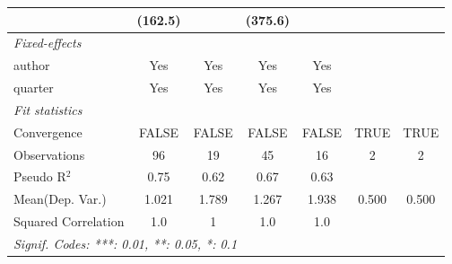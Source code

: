 \begin{tabular}{lcccccc}
                              & (162.5)       &               & (375.6)       &               &      &   \\   
   \midrule
   \emph{Fixed-effects}\\
   author                     & Yes           & Yes           & Yes           & Yes           &      & \\  
   quarter                    & Yes           & Yes           & Yes           & Yes           &      & \\  
   \midrule
   \emph{Fit statistics}\\
   Convergence                &FALSE          & FALSE         & FALSE         & FALSE         & TRUE & TRUE\\  
   Observations               & 96            & 19            & 45            & 16            & 2    & 2\\  
   Pseudo R$^2$               & 0.75          & 0.62          & 0.67          & 0.63          &      & \\  
Mean(Dep. Var.) & 1.021 & 1.789 & 1.267 & 1.938 & 0.500 & 0.500 \\
   Squared Correlation        & 1.0           & 1             & 1.0           & 1.0           &      & \\  
   \midrule \midrule
   \multicolumn{7}{l}{\emph{Signif. Codes: ***: 0.01, **: 0.05, *: 0.1}}\\
\end{tabular}
\par\endgroup
